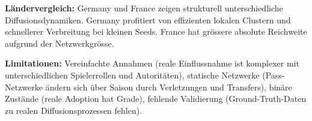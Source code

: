 \textbf{Ländervergleich:} Germany und France zeigen strukturell unterschiedliche Diffusionsdynamiken. Germany profitiert von effizienten lokalen Clustern und schnellerer Verbreitung bei kleinen Seeds. France hat grössere absolute Reichweite aufgrund der Netzwerkgrösse.

\textbf{Limitationen:} Vereinfachte Annahmen (reale Einflussnahme ist komplexer mit unterschiedlichen Spielerrollen und Autoritäten), statische Netzwerke (Pass-Netzwerke ändern sich über Saison durch Verletzungen und Transfers), binäre Zustände (reale Adoption hat Grade), fehlende Validierung (Ground-Truth-Daten zu realen Diffusionsprozessen fehlen).
